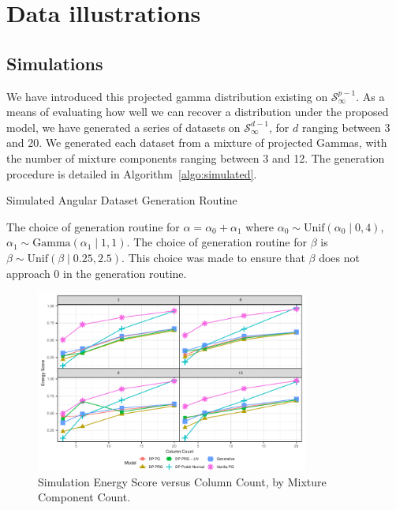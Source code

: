 
\section{Data illustrations}

\subsection{Simulations}
We have introduced this projected gamma distribution existing on $\mathcal{S}_{\infty}^{p-1}$.  As a
  means of evaluating how well we can recover a distribution under the proposed model, we have
  generated a series of datasets on $\mathcal{S}_{\infty}^{d-1}$, for $d$ ranging between 3 and 20.
  We generated each dataset from a mixture of projected Gammas, with the number of mixture components
  ranging between 3 and 12.  The generation procedure is detailed in Algorithm~\ref{algo:simulated}.
  \begin{algorithm}[htb]
    \caption{Simulated Angular Dataset Generation Routine\label{algo:simulated}}
  \end{algorithm}
  The choice of generation routine for $\alpha = \alpha_0 + \alpha_1$ where
  $\alpha_0 \sim \text{Unif}(\alpha_0\mid 0,4)$, $\alpha_1\sim \text{Gamma}(\alpha_1\mid 1,1)$.
  The choice of generation routine for $\beta$ is $\beta\sim\text{Unif}(\beta\mid 0.25, 2.5)$.
  This choice was made to ensure that $\beta$ does not approach 0 in the generation routine.

\begin{figure}[ht]
  \caption{Simulation Energy Score versus Column Count, by Mixture Component Count.\label{fig:simes}}
  \centering
  \includegraphics[width=0.8\textwidth]{./images/simulation_es}
\end{figure}

